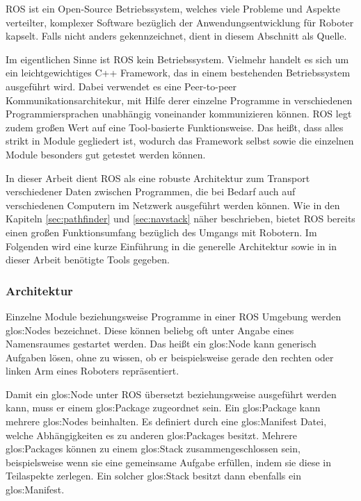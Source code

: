 \gls{ROS} ist ein Open-Source Betriebssystem, welches viele Probleme und Aspekte verteilter, komplexer Software bezüglich der Anwendungsentwicklung für Roboter kapselt. Falls nicht anders gekennzeichnet, dient \cite{Quigley:2009kx} in diesem Abschnitt als Quelle.

Im eigentlichen Sinne ist \gls{ROS} kein Betriebssystem. Vielmehr handelt es sich um ein leichtgewichtiges C++ Framework, das in einem bestehenden Betriebssystem ausgeführt wird. Dabei verwendet es eine Peer-to-peer Kommunikationsarchitekur, mit Hilfe derer einzelne Programme in verschiedenen Programmiersprachen unabhängig voneinander kommunizieren können. \gls{ROS} legt zudem großen Wert auf eine Tool-basierte Funktionsweise. Das heißt, dass alles strikt in Module gegliedert ist, wodurch das Framework selbst sowie die einzelnen Module besonders gut getestet werden können.

In dieser Arbeit dient \gls{ROS} als eine robuste Architektur zum Transport verschiedener Daten zwischen Programmen, die bei Bedarf auch auf verschiedenen Computern im Netzwerk ausgeführt werden können. Wie in den Kapiteln \ref{sec:pathfinder} und \ref{sec:navstack} näher beschrieben, bietet \gls{ROS} bereits einen großen Funktionsumfang bezüglich des Umgangs mit Robotern. Im Folgenden wird eine kurze Einführung in die generelle Architektur sowie in in dieser Arbeit benötigte Tools gegeben.

\subsubsection{Architektur}

Einzelne Module beziehungsweise Programme in einer \gls{ROS} Umgebung werden \glspl{glos:Node} bezeichnet. Diese können beliebg oft unter Angabe eines Namensraumes gestartet werden. Das heißt ein \gls{glos:Node} kann generisch Aufgaben lösen, ohne zu wissen, ob er beispielsweise gerade den rechten oder linken Arm eines Roboters repräsentiert.

Damit ein \gls{glos:Node} unter \gls{ROS} übersetzt beziehungsweise ausgeführt werden kann, muss er einem \gls{glos:Package} zugeordnet sein. Ein \gls{glos:Package} kann mehrere \glspl{glos:Node} beinhalten. Es definiert durch eine \gls{glos:Manifest} Datei, welche Abhängigkeiten es zu anderen \glspl{glos:Package} besitzt. Mehrere \glspl{glos:Package} können zu einem \gls{glos:Stack} zusammengeschlossen sein, beispielsweise wenn sie eine gemeinsame Aufgabe erfüllen, indem sie diese in Teilaspekte zerlegen. Ein solcher \gls{glos:Stack} besitzt dann ebenfalls ein \gls{glos:Manifest}.

